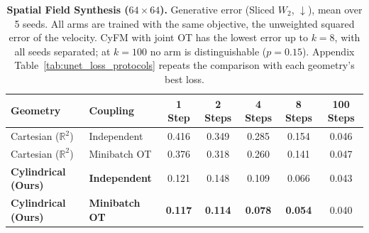 \begin{table}[h]
    \centering
    \caption{\textbf{Spatial Field Synthesis ($64\times64$).} Generative error (Sliced $W_2$, $\downarrow$), mean over 5 seeds. All arms are trained with the same objective, the unweighted squared error of the velocity. CyFM with joint OT has the lowest error up to $k = 8$, with all seeds separated; at $k = 100$ no arm is distinguishable ($p = 0.15$). Appendix Table~\ref{tab:unet_loss_protocols} repeats the comparison with each geometry's best loss.}
    \label{tab:unet_baseline}
    \vspace{1mm}
    \begin{tabular}{llccccc}
        \toprule
        \textbf{Geometry} & \textbf{Coupling} & \textbf{1 Step} & \textbf{2 Steps} & \textbf{4 Steps} & \textbf{8 Steps} & \textbf{100 Steps} \\
        \midrule
        Cartesian ($\mathbb{R}^2$) & Independent & 0.416 & 0.349 & 0.285 & 0.154 & 0.046 \\
        Cartesian ($\mathbb{R}^2$) & Minibatch OT & 0.376 & 0.318 & 0.260 & 0.141 & 0.047 \\
        \midrule
        \textbf{Cylindrical (Ours)} & \textbf{Independent} & 0.121 & 0.148 & 0.109 & 0.066 & 0.043 \\
        \textbf{Cylindrical (Ours)} & \textbf{Minibatch OT} & \textbf{0.117} & \textbf{0.114} & \textbf{0.078} & \textbf{0.054} & 0.040 \\
        \bottomrule
    \end{tabular}
    \vspace{1mm}
\end{table}
